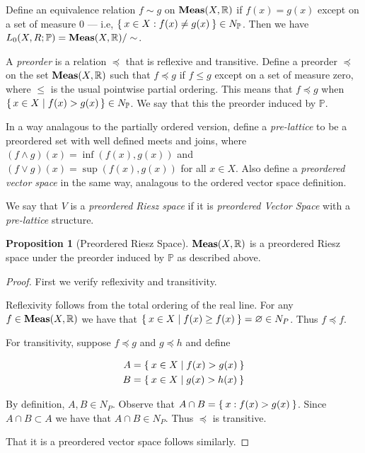 \documentclass[letterpaper,10pt,oneside,onecolumn,reqno]{amsart}
\renewcommand{\P}{\mathbb P}
\newcommand{\R}{\mathbb R}
\theoremstyle{definition}
\newtheorem{pro}[thm]{Proposition}
\newcommand{\catname}[1]{{\normalfont\textbf{#1}}}
\newcommand{\Meas}{\catname{Meas}}
\newcommand{\meet}{\wedge}
\newcommand{\join}{\vee}
\begin{document}
Define an equivalence relation $f \sim g$ on $\Meas(X, \R)$ if $f(x) =
g(x)$ except on a set of measure 0 --- i.e, $\Set{x \in X : f(x) \neq
  g(x)} \in N_\P$. Then we have $L_0(X,R;\P) = \Meas(X,\R) / \sim$.

A \emph{preorder} is a relation $\preceq $ that is
reflexive and transitive. Define a preorder $\preceq $ on the set
$\Meas(X,\R)$ such that $f \preceq g$ if $f \leq g$ except on a set of
measure zero, where $\leq $ is the usual pointwise partial
ordering. This means that $f \preceq g$ when $\set{x \in X | f(x) >
  g(x)} \in N_\P$. We say that this the preorder induced by $\P$.

In a way analagous to the partially ordered version, define a
\emph{pre-lattice} to be a preordered set with well
defined meets and joins, where $(f \meet g)(x) = \inf(f(x),g(x))$ and
$(f \join g)(x) = \sup(f(x),g(x))$ for all $x \in X$. Also define a
\emph{preordered vector space} in the
same way, analagous to the ordered vector space definition.

We say that $V$ is a \emph{preordered
  Riesz space} if it is \emph{preordered Vector Space} with a
\emph{pre-lattice} structure.

\begin{pro}[Preordered Riesz Space]\label{pro:1}
  $\Meas(X, \R)$ is a preordered Riesz space under the preorder
  induced by $\P$ as described above.
\end{pro}

\begin{proof}
  First we verify reflexivity and transitivity.

  Reflexivity follows from the total ordering of the real line. For
  any $f \in \Meas(X, \R)$ we have that $\Set{x \in X | f(x) \geq
    f(x)} = \varnothing \in N_P$. Thus $f \preceq f$.

  For transitivity, suppose $f \preceq g$ and $g \preceq h$ and define

\begin{align*}
  A &= \Set{x \in X | f(x) > g(x)} \\
  B &= \Set{x \in X | g(x) > h(x)}
\end{align*}

By definition, $A,B \in N_P$. Observe that $A \cap B = \Set{x : f(x) >
  g(x)}$. Since $A \cap B \subset A$ we have that $A \cap B \in
N_P$. Thus $\preceq $ is transitive.

That it is a preordered vector space follows similarly.

\end{proof}
\end{document}

